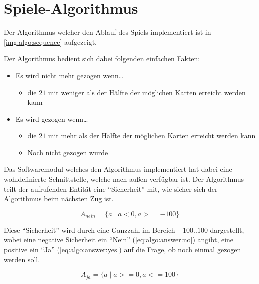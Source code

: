 \chapter{Spiele-Algorithmus}

    Der Algorithmus welcher den Ablauf des Spiels implementiert ist in
    \autoref{img:algo:sequence} aufgezeigt.

    Der Algorithmus bedient sich dabei folgenden einfachen Fakten:

    \begin{itemize}
        \item Es wird nicht mehr gezogen wenn\dots
            \begin{itemize}
                \item die $21$ mit weniger als der Hälfte der möglichen Karten
                    erreicht werden kann
            \end{itemize}
        \item Es wird gezogen wenn\dots
            \begin{itemize}
                \item die $21$ mit mehr als der Hälfte der möglichen Karten
                    erreicht werden kann
                \item Noch nicht gezogen wurde
            \end{itemize}
    \end{itemize}

    Das Softwaremodul welches den Algorithmus implementiert hat dabei eine
    wohldefinierte Schnittstelle, welche nach außen verfügbar ist.
    Der Algorithmus teilt der aufrufenden Entität eine ``Sicherheit'' mit,
    wie sicher sich der Algorithmus beim nächsten Zug ist.

    \begin{equation}
        \label{eq:algo:answer:no}
        A_{nein} = \{ a \mid a < 0, a >= -100 \}
    \end{equation}

    Diese ``Sicherheit'' wird durch eine Ganzzahl im Bereich $-100..100$
    dargestellt, wobei eine negative Sicherheit ein ``Nein''
    (\ref{eq:algo:answer:no}) angibt, eine positive ein ``Ja''
    (\ref{eq:algo:answer:yes}) auf die Frage, ob noch einmal gezogen werden soll.

    \begin{equation}
        \label{eq:algo:answer:yes}
        A_{ja} = \{ a \mid a >= 0, a <= 100 \}
    \end{equation}

